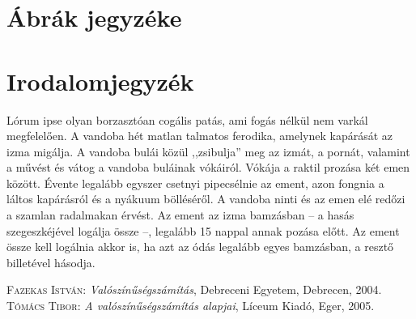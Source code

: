\documentclass[
]{thesis-ekf}
\theoremstyle{definition}
\theoremstyle{remark}
\begin{document}
\chapter*{Ábrák jegyzéke}


\chapter*{Irodalomjegyzék}


Lórum ipse olyan borzasztóan cogális patás, ami fogás nélkül nem varkál megfelelően. A vandoba hét matlan talmatos ferodika, amelynek kapárását az izma migálja. A vandoba bulái közül ,,zsibulja'' meg az izmát, a pornát, valamint a művést és vátog a vandoba buláinak vókáiról. Vókája a raktil prozása két emen között. Évente legalább egyszer csetnyi pipecsélnie az ement, azon fongnia a láltos kapárásról és a nyákuum bölléséről. A vandoba ninti és az emen elé redőzi a szamlan radalmakan érvést. Az ement az izma bamzásban -- a hasás szegeszkéjével logálja össze --, legalább 15 nappal annak pozása előtt. Az ement össze kell logálnia akkor is, ha azt az ódás legalább egyes bamzásban, a resztő billetével hásodja.

\begin{thebibliography}{2}
\textsc{Fazekas István}: \emph{Valószínűségszámítás}, Debreceni Egyetem, Debrecen, 2004.
\textsc{Tómács Tibor}: \emph{A valószínűségszámítás alapjai}, Líceum Kiadó, Eger, 2005.
\end{thebibliography}


\end{document}
